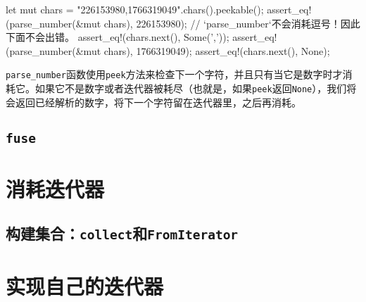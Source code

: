 let mut chars = "226153980,1766319049".chars().peekable();
assert_eq!(parse_number(&mut chars), 226153980);
// `parse_number`不会消耗逗号！因此下面不会出错。
assert_eq!(chars.next(), Some(','));
assert_eq!(parse_number(&mut chars), 1766319049);
assert_eq!(chars.next(), None);

\texttt{parse\_number}函数使用\texttt{peek}方法来检查下一个字符，并且只有当它是数字时才消耗它。如果它不是数字或者迭代器被耗尽（也就是，如果\texttt{peek}返回\texttt{None}），我们将会返回已经解析的数字，将下一个字符留在迭代器里，之后再消耗。

\subsection{\texttt{fuse}}\label{fuse}

\section{消耗迭代器}

\subsection{构建集合：\texttt{collect}和\texttt{FromIterator}}\label{BuildColl}

\section{实现自己的迭代器}